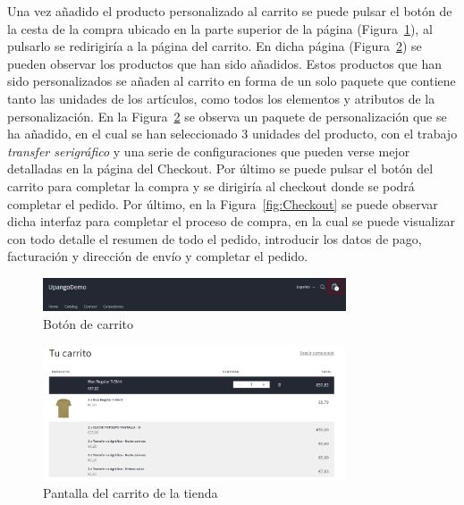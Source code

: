 \documentclass[12pt]{article}
\begin{document}
Una vez añadido el producto personalizado al carrito se puede pulsar el botón de la cesta de la compra ubicado en la parte superior de la página (Figura~\ref{fig:BotonCarrito}), al pulsarlo se redirigiría a la página del carrito.
En dicha página (Figura~\ref{fig:Carrito}) se pueden observar los productos que han sido añadidos. Estos productos que han sido personalizados se añaden al carrito en forma de un solo paquete que contiene
tanto las unidades de los artículos, como todos los elementos y atributos de la personalización.
En la Figura~\ref{fig:Carrito} se observa un paquete de personalización que se ha añadido, en el cual se han seleccionado 3 unidades del producto, con el trabajo \textit{transfer serigráfico} y una serie de configuraciones 
que pueden verse mejor detalladas en la página del Checkout. Por último se puede pulsar el botón del carrito para completar la compra y se dirigiría al checkout donde se podrá completar el pedido.
Por último, en la Figura~\ref{fig:Checkout} se puede observar dicha interfaz para completar el proceso de compra, en la cual se puede visualizar con todo detalle el resumen de todo el pedido, introducir los datos de pago, facturación y dirección de envío
y completar el pedido.


\begin{figure}[ht]
    \centering
    \includegraphics[width=0.8\textwidth]{imagenes/ManualUsuario/BotonCarrito.png}
    \caption{\label{fig:BotonCarrito}Botón de carrito}
    \vspace{\fill}
\end{figure}

\begin{figure}[ht]
    \centering
    \includegraphics[width=0.8\textwidth]{imagenes/ManualUsuario/PantallaCarrito.png}
    \caption{\label{fig:Carrito}Pantalla del carrito de la tienda}
    \vspace{\fill}
\end{figure}
\end{document}
